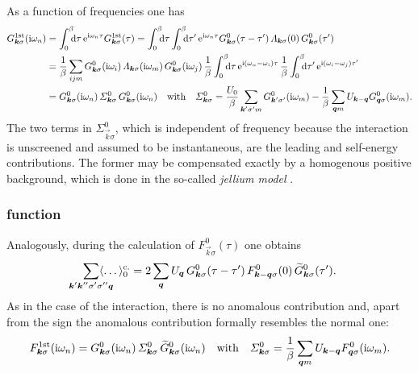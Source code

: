 As a function of  frequencies one has
%
\begin{align*}
    G \super{1st}_{\vec k \sigma}(\I \omega_n) &=
    \int \from 0 \till \beta \D \tau \, \E^{\I \omega_n \tau}
    G \super{1st}_{\vec k \sigma}(\tau) =
    \int \from 0 \till \beta \D \tau
    \int \from 0 \till \beta \D \tau' \,
    \E^{\I \omega_n \tau}
    G^0_{\vec k \sigma}(\tau - \tau') \,
    \Lambda_{\vec k \sigma}(0) \,
    G^0_{\vec k \sigma}(\tau')
    \\
    &= \frac 1 \beta \sum_{i j m}
    G^0_{\vec k \sigma}(\I \omega_i) \,
    \Lambda_{\vec k \sigma}(\I \omega_m) \,
    G^0_{\vec k \sigma}(\I \omega_j) \,
    \frac 1 \beta \int \from 0 \till \beta \D \tau \,
    \E^{\I (\omega_n - \omega_i) \tau} \,
    \frac 1 \beta \int \from 0 \till \beta \D \tau' \,
    \E^{\I (\omega_i - \omega_j) \tau'}
    \\
    &= G^0_{\vec k \sigma}(\I \omega_n) \,
    \Sigma^0_{\vec k \sigma} \,
    G^0_{\vec k \sigma}(\I \omega_n)
    \quad \text{with} \quad
    \Sigma^0_{\vec k \sigma}
    = \frac {U_0} \beta \sum_{\vec k' \sigma' m}
    G^0_{\vec k' \sigma'}(\I \omega_m)
    - \frac 1 \beta \sum_{\vec q m} U_{\vec k - \vec q}
    G^0_{\vec q \sigma}(\I \omega_m).
\end{align*}
%
The two terms in $\Sigma^0_{\vec k \sigma}$, which is independent of frequency
because the  interaction is unscreened and assumed to be
instantaneous, are the leading  and  self-energy
contributions. The former may be compensated exactly by a homogenous positive
background, which is done in the so-called \emph{jellium model}
\cite[182]{Czycholl08}.

\subsubsection{ function}

Analogously, during the calculation of $F^0_{\vec k \sigma}(\tau)$ one obtains
%
\begin{align*}
    \sum_{\mathclap{\vec k' \vec k'' \sigma' \sigma'' \vec q}}
    \av \dots_0 \super{c.}
    = 2 \sum_{\vec q} U_{\vec q} \,
    G^0_{\vec k \sigma}(\tau - \tau') \,
    F^0_{\vec k - \vec q \sigma}(0) \,
    \widetilde G^0_{\vec k \sigma}(\tau').
\end{align*}
%
As in the case of the  interaction, there is no anomalous
 contribution and, apart from the sign the anomalous 
contribution formally resembles the normal one:
%
\begin{equation*}
    F \sp{\text{1st}}_{\boldsymbol k \sigma}(\mathrm i \omega_n)
    = G^0_{\boldsymbol k \sigma}(\mathrm i \omega_n) \,
    \varSigma^0_{\boldsymbol k \sigma} \,
    \widetilde G^0_{\boldsymbol k \sigma}(\mathrm i \omega_n)
    \quad \text{with} \quad
    \varSigma^0_{\boldsymbol k \sigma}
    = \frac 1 \beta \sum_{\boldsymbol q m} U_{\boldsymbol k - \boldsymbol q}
    F^0_{\boldsymbol q \sigma}(\mathrm i \omega_m).
\end{equation*}

